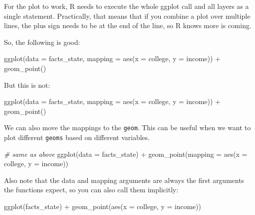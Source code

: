 \documentclass[
]{article}
\newenvironment{Shaded}{\begin{snugshade}}{\end{snugshade}}
\newcommand{\AttributeTok}[1]{\textcolor[rgb]{0.77,0.63,0.00}{#1}}
\newcommand{\CommentTok}[1]{\textcolor[rgb]{0.56,0.35,0.01}{\textit{#1}}}
\newcommand{\FunctionTok}[1]{\textcolor[rgb]{0.00,0.00,0.00}{#1}}
\newcommand{\NormalTok}[1]{#1}
\newcommand{\SpecialCharTok}[1]{\textcolor[rgb]{0.00,0.00,0.00}{#1}}
\begin{document}
For the plot to work, R needs to execute the whole ggplot call and all
layers as a single statement. Practically, that means that if you
combine a plot over multiple lines, the plus sign needs to be at the end
of the line, so R knows more is coming.

So, the following is good:

\begin{Shaded}
\begin{Highlighting}[]
\FunctionTok{ggplot}\NormalTok{(}\AttributeTok{data =}\NormalTok{ facts\_state,}
       \AttributeTok{mapping =} \FunctionTok{aes}\NormalTok{(}\AttributeTok{x =}\NormalTok{ college, }\AttributeTok{y =}\NormalTok{ income)) }\SpecialCharTok{+} 
  \FunctionTok{geom\_point}\NormalTok{()}
\end{Highlighting}
\end{Shaded}

But this is not:

\begin{Shaded}
\begin{Highlighting}[]
\FunctionTok{ggplot}\NormalTok{(}\AttributeTok{data =}\NormalTok{ facts\_state,}
       \AttributeTok{mapping =} \FunctionTok{aes}\NormalTok{(}\AttributeTok{x =}\NormalTok{ college, }\AttributeTok{y =}\NormalTok{ income)) }
  \SpecialCharTok{+} \FunctionTok{geom\_point}\NormalTok{()}
\end{Highlighting}
\end{Shaded}

We can also move the mappings to the \texttt{geom}. This can be useful
when we want to plot different \texttt{geoms} based on different
variables.

\begin{Shaded}
\begin{Highlighting}[]
\CommentTok{\# same as above}
\FunctionTok{ggplot}\NormalTok{(}\AttributeTok{data =}\NormalTok{ facts\_state) }\SpecialCharTok{+} 
  \FunctionTok{geom\_point}\NormalTok{(}\AttributeTok{mapping =} \FunctionTok{aes}\NormalTok{(}\AttributeTok{x =}\NormalTok{ college, }\AttributeTok{y =}\NormalTok{ income))}
\end{Highlighting}
\end{Shaded}

Also note that the data and mapping arguments are always the first
arguments the functions expect, so you can also call them implicitly:

\begin{Shaded}
\begin{Highlighting}[]
\FunctionTok{ggplot}\NormalTok{(facts\_state) }\SpecialCharTok{+} 
  \FunctionTok{geom\_point}\NormalTok{(}\FunctionTok{aes}\NormalTok{(}\AttributeTok{x =}\NormalTok{ college, }\AttributeTok{y =}\NormalTok{ income))}
\end{Highlighting}
\end{Shaded}
\end{document}
